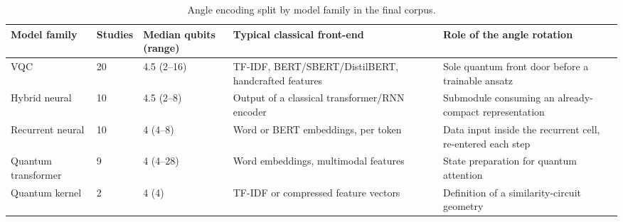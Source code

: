 \documentclass{ieeeaccess}
\begin{document}
\begin{table}[t]
\caption{Angle encoding split by model family in the final corpus.}
\label{tab:angle_by_family}
\centering
\scriptsize
\begin{tabular}{@{}p{} p{} p{} p{} p{}@{}}
\hline
\textbf{Model family} & \textbf{Studies} & \textbf{Median qubits (range)} & \textbf{Typical classical front-end} & \textbf{Role of the angle rotation} \\
\hline
VQC & 20 & 4.5 (2--16) & TF-IDF, BERT/SBERT/DistilBERT, handcrafted features & Sole quantum front door before a trainable ansatz \\
Hybrid neural & 10 & 4.5 (2--8) & Output of a classical transformer/RNN encoder & Submodule consuming an already-compact representation \\
Recurrent neural & 10 & 4 (4--8) & Word or BERT embeddings, per token & Data input inside the recurrent cell, re-entered each step \\
Quantum transformer & 9 & 4 (4--28) & Word embeddings, multimodal features & State preparation for quantum attention \\
Quantum kernel & 2 & 4 (4) & TF-IDF or compressed feature vectors & Definition of a similarity-circuit geometry \\
\hline
\end{tabular}
\end{table}
\end{document}
